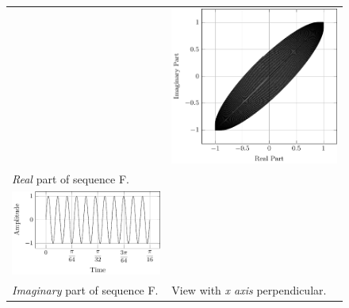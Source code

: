 \documentclass[../../course]{subfiles}
\begin{document}
\begin{figure} [H]
\begin{NiceTabularX} {\textwidth} {
            *{2}{>{\centering\arraybackslash}X}
        }
        &

         {
             {
                \includegraphics[height = \textheight] {tikzpics/plotFrontViewComplexF.pdf}
            }
        }

        \\

         {\emph{Real} part of sequence F.}
        \label{plt:realCmplxF}

        &
        \\

         {
             {
                \includegraphics[height = \textheight] {tikzpics/plotShortX3.pdf}
            }
        }

        &
        \\

         {\emph{Imaginary} part of sequence F.}
        \label{plt:imagCmplxF}

        &

         {View with \emph{x axis} perpendicular.}
        \label{plt:frontViewCmplxF}

        \\

    \end{NiceTabularX}

\end{figure}
\end{document}
